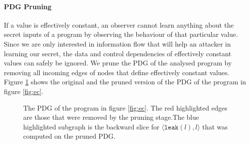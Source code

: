 \paragraph{PDG Pruning}
If a value is effectively constant, an observer cannot learn anything about the secret inputs of a program by observing the behaviour of that particular value. Since we are only interested in information flow that will help an attacker in learning our secret, the data and control dependencies of effectively constant values can safely be ignored.  We prune the PDG of the analysed program by removing all incoming edges of nodes that define effectively constant values. Figure \ref{fig:prune} shows the original and the pruned version of the PDG of the program in figure \ref{fig:ec}.

\begin{figure}
    \centering
    \caption{The PDG of the program in figure \ref{fig:ec}. The red highlighted edges are those that were removed by the pruning stage.The blue highlighted subgraph is the backward slice for $\langle \mathtt{leak}(l), l \rangle$ that was computed on the pruned PDG. }
    \label{fig:prune}
\end{figure}

